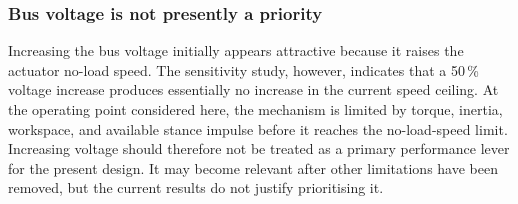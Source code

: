 \subsubsection{Bus voltage is not presently a priority}

Increasing the bus voltage initially appears attractive because it raises the actuator no-load speed.
The sensitivity study, however, indicates that a 50\,\% voltage increase produces essentially no increase in the current speed ceiling.
At the operating point considered here, the mechanism is limited by torque, inertia, workspace, and available stance impulse before it reaches the no-load-speed limit.
Increasing voltage should therefore not be treated as a primary performance lever for the present design.
It may become relevant after other limitations have been removed, but the current results do not justify prioritising it.


